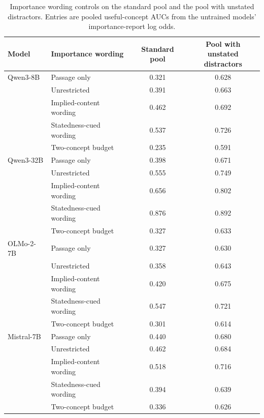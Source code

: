 \begin{table}[t]
\centering
\caption{Importance wording controls on the standard pool and the pool with unstated distractors. Entries are
pooled useful-concept AUCs from the untrained models' importance-report log odds.}
\label{tab:wording}
\small
\setlength{\tabcolsep}{4pt}
\begin{tabular}{llcc}
\toprule
Model & Importance wording & Standard pool & \shortstack{Pool with unstated\\distractors} \\
\midrule
Qwen3-8B & Passage only & 0.321 & 0.628 \\
 & Unrestricted & 0.391 & 0.663 \\
 & Implied-content wording & 0.462 & 0.692 \\
 & Statedness-cued wording & 0.537 & 0.726 \\
 & Two-concept budget & 0.235 & 0.591 \\
\addlinespace
Qwen3-32B & Passage only & 0.398 & 0.671 \\
 & Unrestricted & 0.555 & 0.749 \\
 & Implied-content wording & 0.656 & 0.802 \\
 & Statedness-cued wording & 0.876 & 0.892 \\
 & Two-concept budget & 0.327 & 0.633 \\
\addlinespace
OLMo-2-7B & Passage only & 0.327 & 0.630 \\
 & Unrestricted & 0.358 & 0.643 \\
 & Implied-content wording & 0.420 & 0.675 \\
 & Statedness-cued wording & 0.547 & 0.721 \\
 & Two-concept budget & 0.301 & 0.614 \\
\addlinespace
Mistral-7B & Passage only & 0.440 & 0.680 \\
 & Unrestricted & 0.462 & 0.684 \\
 & Implied-content wording & 0.518 & 0.716 \\
 & Statedness-cued wording & 0.394 & 0.639 \\
 & Two-concept budget & 0.336 & 0.626 \\
\bottomrule
\end{tabular}

\end{table}
